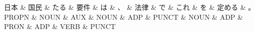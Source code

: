 \documentclass[tikz,border=5pt]{standalone}
\begin{document}
\normalsize
\begin{dependency}[edge unit distance=12.0pt]
    \begin{deptext}[column sep=1em]
        日本 \& 国民 \& たる \& 要件 \& は \& 、 \& 法律 \& で \& これ \& を \& 定める \& 。\\
        PROPN \& NOUN \& AUX \& NOUN \& ADP \& PUNCT \& NOUN \& ADP \& PRON \& ADP \& VERB \& PUNCT\\
    \end{deptext}
\end{dependency}
\end{document}
